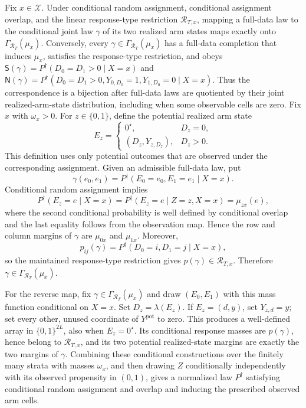 Fix \(x\in\mathcal X\).  Under conditional random assignment, conditional assignment overlap, and the linear response-type restriction \(\mathcal R_{T,x}\), mapping a full-data law to the conditional joint law \(\gamma\) of its two realized arm states maps exactly onto \(\Gamma_{\mathcal R_T}(\mu_x)\).  Conversely, every \(\gamma\in\Gamma_{\mathcal R_T}(\mu_x)\) has a full-data completion that induces \(\mu_x\), satisfies the response-type restriction, and obeys \(\mathsf S(\gamma)=P^{\dagger}(D_0=D_1>0\mid X=x)\) and \(\mathsf N(\gamma)=P^{\dagger}(D_0=D_1>0,Y_{0,D_0}=1,Y_{1,D_0}=0\mid X=x)\).  Thus the correspondence is a bijection after full-data laws are quotiented by their joint realized-arm-state distribution, including when some observable cells are zero.
Fix \(x\) with \(\omega_x>0\).  For \(z\in\{0,1\}\), define the potential realized arm state
\[E_z=\begin{cases}
0^{\star},&D_z=0,\\
(D_z,Y_{z,D_z}),&D_z>0.
\end{cases}\]
This definition uses only potential outcomes that are observed under the corresponding assignment.  Given an admissible full-data law, put
\[\gamma(e_0,e_1)=P^{\dagger}(E_0=e_0,E_1=e_1\mid X=x).\]
Conditional random assignment implies
\[P^{\dagger}(E_z=e\mid X=x)=P^{\dagger}(E_z=e\mid Z=z,X=x)=\mu_{zx}(e),\]
where the second conditional probability is well defined by conditional overlap and the last equality follows from the observation map.  Hence the row and column margins of \(\gamma\) are \(\mu_{0x}\) and \(\mu_{1x}\).  Moreover,
\[p_{ij}(\gamma)=P^{\dagger}(D_0=i,D_1=j\mid X=x),\]
so the maintained response-type restriction gives \(p(\gamma)\in\mathcal R_{T,x}\).  Therefore \(\gamma\in\Gamma_{\mathcal R_T}(\mu_x)\).

For the reverse map, fix \(\gamma\in\Gamma_{\mathcal R_T}(\mu_x)\) and draw \((E_0,E_1)\) with this mass function conditional on \(X=x\).  Set \(D_z=\lambda(E_z)\).  If \(E_z=(d,y)\), set \(Y_{z,d}=y\); set every other, unused coordinate of \(Y^{\mathrm{pot}}\) to zero.  This produces a well-defined array in \(\{0,1\}^{2L}\), also when \(E_z=0^{\star}\).  Its conditional response masses are \(p(\gamma)\), hence belong to \(\mathcal R_{T,x}\), and its two potential realized-state margins are exactly the two margins of \(\gamma\).  Combining these conditional constructions over the finitely many strata with masses \(\omega_x\), and then drawing \(Z\) conditionally independently with its observed propensity in \((0,1)\), gives a normalized law \(P^{\dagger}\) satisfying conditional random assignment and overlap and inducing the prescribed observed arm cells.

